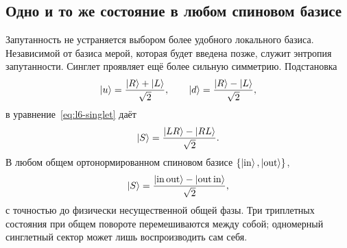 \begin{classroomqa}
\end{classroomqa}

\begin{classroomqa}
\end{classroomqa}

\subsection{Одно и то же состояние в любом спиновом базисе}

Запутанность не устраняется выбором более удобного локального базиса. Независимой от базиса мерой, которая будет введена позже, служит энтропия запутанности. Синглет проявляет ещё более сильную симметрию. Подстановка
\begin{equation}
\left\lvert u\right\rangle=\frac{\left\lvert R\right\rangle+\left\lvert L\right\rangle}{\sqrt2},
\qquad
\left\lvert d\right\rangle=\frac{\left\lvert R\right\rangle-\left\lvert L\right\rangle}{\sqrt2},
\end{equation}
в уравнение~\eqref{eq:l6-singlet} даёт
\begin{equation}
\left\lvert S\right\rangle
=\frac{\left\lvert LR\right\rangle-\left\lvert RL\right\rangle}{\sqrt2}.
\label{eq:l6-singlet-x-basis}
\end{equation}
В любом общем ортонормированном спиновом базисе \(\{\left\lvert\rm in\right\rangle,\left\lvert\rm out\right\rangle\}\),
\begin{equation}
\left\lvert S\right\rangle
=\frac{\left\lvert{\rm in}\,{\rm out}\right\rangle-\left\lvert{\rm out}\,{\rm in}\right\rangle}{\sqrt2},
\label{eq:l6-singlet-any-basis}
\end{equation}
с точностью до физически несущественной общей фазы. Три триплетных состояния при общем повороте перемешиваются между собой; одномерный синглетный сектор может лишь воспроизводить сам себя.

